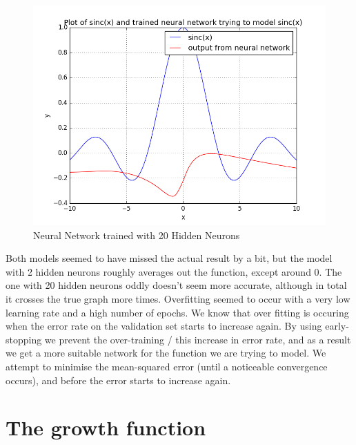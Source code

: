 \documentclass{article}
\begin{document}
\begin{figure}[h]
\includegraphics[width=16cm]{figs/nn20.png}
\caption{Neural Network trained with 20 Hidden Neurons}
\label{fig:nn20}
\end{figure}

Both models seemed to have missed the actual result by a bit, but the model with 2 hidden neurons roughly averages out the function, except around 0. The one with 20 hidden neurons oddly doesn't seem more accurate, although in total it crosses the true graph more times. Overfitting seemed to occur with a very low learning rate and a high number of epochs. We know that over fitting is occuring when the error rate on the validation set starts to increase again. By using early-stopping we prevent the over-training / this increase in error rate, and as a result we get a more suitable network for the function we are trying to model. We attempt to minimise the mean-squared error (until a noticeable convergence occurs), and before the error starts to increase again. 

\newpage
\section{The growth function}

\subsection{}

\subsection{}
\end{document}
